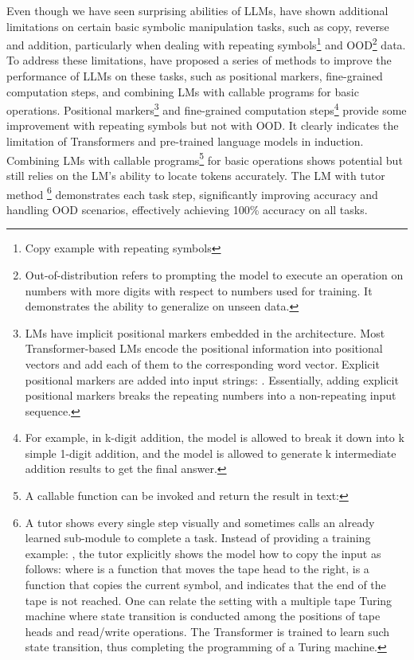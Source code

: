 Even though we have seen surprising abilities of LLMs, \textcite{qian2022limitations} have shown additional limitations on certain basic symbolic manipulation tasks, such as copy, reverse and addition, particularly when dealing with repeating symbols\footnote{Copy example with repeating symbols } and OOD\footnote{Out-of-distribution refers to prompting the model to execute an operation on numbers with more digits with respect to numbers used for training. It demonstrates the ability to generalize on unseen data.} data.
To address these limitations, \textcite{qian2022limitations} have proposed a series of methods to improve the performance of LLMs on these tasks, such as positional markers, fine-grained computation steps, and combining LMs with callable programs for basic operations.
Positional markers\footnote{LMs have implicit positional markers embedded in the architecture. Most Transformer-based LMs encode the positional information into positional vectors and add each of
	them to the corresponding word vector. Explicit positional markers are added into input strings: .
	Essentially, adding explicit positional markers breaks the repeating numbers into a non-repeating input sequence.} and fine-grained computation steps\footnote{For example, in k-digit addition, the model is allowed to break it down into k simple 1-digit addition, and the model is allowed to generate k intermediate addition results to get the final answer.} provide some improvement with repeating symbols but not with OOD\@.
It clearly indicates the limitation of Transformers and pre-trained language models in induction.
Combining LMs with callable programs\footnote{A callable function  can be invoked and return the result in text: } for basic operations shows potential but still relies on the LM's ability to locate tokens accurately.
The LM with tutor method
\footnote{A tutor shows every single step visually and sometimes calls an already learned sub-module to complete a task. Instead of providing a training example: , the tutor explicitly shows the model how to copy the input as follows:  where  is a function that moves the tape head to the right,  is a function that copies the current symbol, and  indicates that the end of the tape is not reached. One can relate the setting with a multiple tape Turing machine where state transition is conducted among the positions of tape heads and read/write operations. The Transformer is trained to learn such state transition, thus completing the programming of a Turing machine.} demonstrates each task step, significantly improving accuracy and handling OOD scenarios, effectively achieving 100\% accuracy on all tasks.

